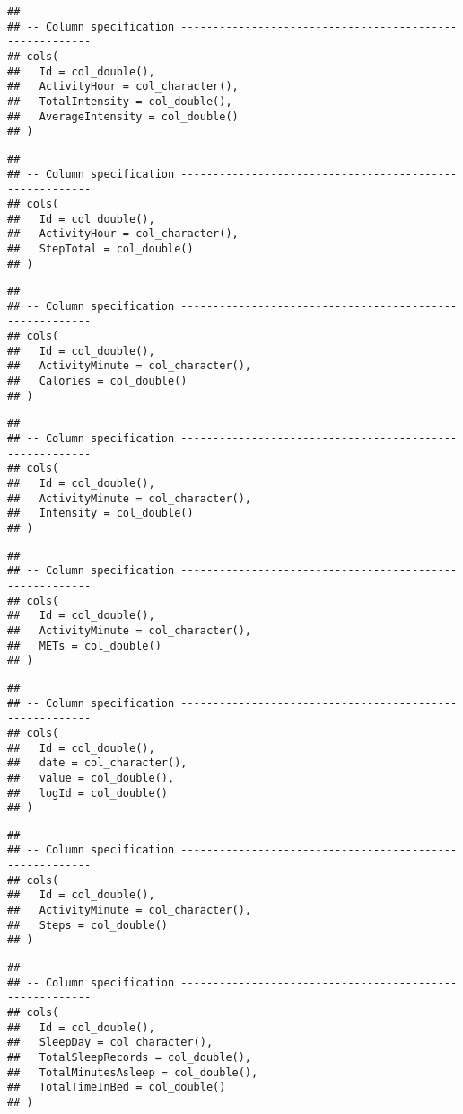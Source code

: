 \documentclass[
]{article}
\begin{document}
\begin{verbatim}
## 
## -- Column specification --------------------------------------------------------
## cols(
##   Id = col_double(),
##   ActivityHour = col_character(),
##   TotalIntensity = col_double(),
##   AverageIntensity = col_double()
## )
\end{verbatim}

\begin{verbatim}
## 
## -- Column specification --------------------------------------------------------
## cols(
##   Id = col_double(),
##   ActivityHour = col_character(),
##   StepTotal = col_double()
## )
\end{verbatim}

\begin{verbatim}
## 
## -- Column specification --------------------------------------------------------
## cols(
##   Id = col_double(),
##   ActivityMinute = col_character(),
##   Calories = col_double()
## )
\end{verbatim}

\begin{verbatim}
## 
## -- Column specification --------------------------------------------------------
## cols(
##   Id = col_double(),
##   ActivityMinute = col_character(),
##   Intensity = col_double()
## )
\end{verbatim}

\begin{verbatim}
## 
## -- Column specification --------------------------------------------------------
## cols(
##   Id = col_double(),
##   ActivityMinute = col_character(),
##   METs = col_double()
## )
\end{verbatim}

\begin{verbatim}
## 
## -- Column specification --------------------------------------------------------
## cols(
##   Id = col_double(),
##   date = col_character(),
##   value = col_double(),
##   logId = col_double()
## )
\end{verbatim}

\begin{verbatim}
## 
## -- Column specification --------------------------------------------------------
## cols(
##   Id = col_double(),
##   ActivityMinute = col_character(),
##   Steps = col_double()
## )
\end{verbatim}

\begin{verbatim}
## 
## -- Column specification --------------------------------------------------------
## cols(
##   Id = col_double(),
##   SleepDay = col_character(),
##   TotalSleepRecords = col_double(),
##   TotalMinutesAsleep = col_double(),
##   TotalTimeInBed = col_double()
## )
\end{verbatim}
\end{document}
